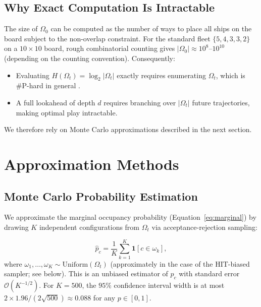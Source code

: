\documentclass[12pt,a4paper]{article}
\newcommand{\1}{\mathbf{1}}
\newcommand{\bigo}{\mathcal{O}}
\begin{document}
\subsection{Why Exact Computation Is Intractable}

The size of $\Omega_0$ can be computed as the number of ways to place all ships
on the board subject to the non-overlap constraint.  For the standard fleet
$\{5,4,3,3,2\}$ on a $10\times10$ board, rough combinatorial counting gives
$|\Omega_0| \approx 10^8$--$10^{10}$ (depending on the counting convention).
Consequently:
\begin{itemize}[nosep]
  \item Evaluating $H(\Omega_t) = \log_2|\Omega_t|$ exactly requires enumerating
        $\Omega_t$, which is \#P-hard in general \cite{valiant1979}.
  \item A full lookahead of depth $d$ requires branching over $|\Omega_t|$
        future trajectories, making optimal play intractable.
\end{itemize}

We therefore rely on Monte Carlo approximations described in the next section.

\section{Approximation Methods}
\label{sec:approximation}

\subsection{Monte Carlo Probability Estimation}

We approximate the marginal occupancy probability (Equation~\ref{eq:marginal})
by drawing $K$ independent configurations from $\Omega_t$ via
acceptance-rejection sampling:

\begin{equation}
  \hat{p}_c = \frac{1}{K} \sum_{k=1}^{K} \1[c \in \omega_k],
  \label{eq:mc_prob}
\end{equation}
where $\omega_1, \ldots, \omega_K \sim \mathrm{Uniform}(\Omega_t)$ (approximately
in the case of the HIT-biased sampler; see below).  This is an unbiased estimator
of $p_c$ with standard error $\bigo(K^{-1/2})$.  For $K = 500$, the $95\%$
confidence interval width is at most $2 \times 1.96 / (2\sqrt{500}) \approx 0.088$
for any $p \in [0,1]$.
\end{document}
